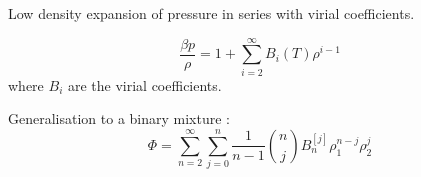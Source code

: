 Low density expansion of pressure in series with virial coefficients.

\begin{equation}
  \frac{\beta p}{\rho} =
  1 + \sum_{i=2}^\infty B_i(T) \rho^{i-1}
\end{equation}
where $B_i$ are the virial coefficients.

Generalisation to a binary mixture : \cite{Hansen-Goos2014}
\begin{equation}\label{eq:virial-series-binary}
  \Phi = \sum_{n=2}^\infty \sum_{j=0}^{n}
  \frac{1}{n-1} {n \choose j} B_n^{[j]} \rho_1^{n-j} \rho_2^j
\end{equation}

